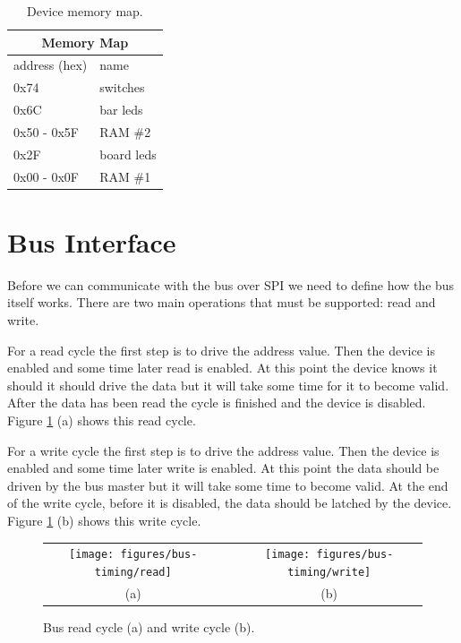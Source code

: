 \documentclass{article}
\begin{document}
\begin{table}[hbp]
\center
\begin{tabular}{|l|l|}
    \hline
    \multicolumn{2}{|c|}{\textbf{Memory Map}} \\
    \hline
    address (hex) & name \\
    \hline
    0x74 & switches \\
    0x6C & bar leds \\
    0x50 - 0x5F & RAM \#2 \\
    0x2F & board leds \\
    0x00 - 0x0F & RAM \#1 \\
    \hline
\end{tabular}
\caption{Device memory map.}
\label{tbl:memmap}
\end{table}



\section{Bus Interface}
\label{sec:bus}

Before we can communicate with the bus over SPI we need
to define how the bus itself works.
There are two main operations that must be supported: read and write.

For a read cycle the first step is to drive the address value.
Then the device is enabled and some time later read is enabled.
At this point the device knows it should it should drive the
data but it will take some time for it to become valid.
After the data has been read the cycle is finished and the device is disabled.
Figure \ref{fig:bus_cycle} (a) shows this read cycle.

For a write cycle the first step is to drive the address value.
Then the device is enabled and some time later write is enabled.
At this point the data should be driven by the bus master
but it will take some time to become valid.
At the end of the write cycle, before it is disabled,
the data should be latched by the device.
Figure \ref{fig:bus_cycle} (b) shows this write cycle.

\begin{figure}
\center

\begin{tabular}{ccc}
\texttt{[image: figures/bus-timing/read]} & \quad &
\texttt{[image: figures/bus-timing/write]} \\
(a) && (b) 
\end{tabular}

\caption{Bus read cycle (a) and write cycle (b).}
\label{fig:bus_cycle}
\end{figure}
\end{document}

